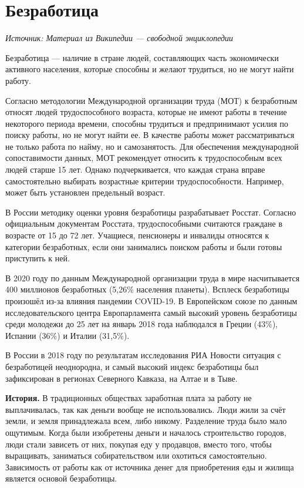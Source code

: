 
\section{Безработица}

\textit{Источник: Материал из Википедии — свободной энциклопедии}


Безработица — наличие в стране людей, составляющих часть экономически активного населения, которые способны и желают трудиться, но не могут найти работу.

Согласно методологии Международной организации труда (МОТ) к безработным относят людей трудоспособного возраста, которые не имеют работы в течение некоторого периода времени, способны трудиться и предпринимают усилия по поиску работы, но не могут найти ее. В качестве работы может рассматриваться не только работа по найму, но и самозанятость. Для обеспечения международной сопоставимости данных, МОТ рекомендует относить к трудоспособным всех людей старше 15 лет. Однако подчеркивается, что каждая страна вправе самостоятельно выбирать возрастные критерии трудоспособности. Например, может быть установлен предельный возраст.

В России методику оценки уровня безработицы разрабатывает Росстат. Согласно официальным документам Росстата, трудоспособными считаются граждане в возрасте от 15 до 72 лет. Учащиеся, пенсионеры и инвалиды относятся к категории безработных, если они занимались поиском работы и были готовы приступить к ней.

В 2020 году по данным Международной организации труда в мире насчитывается 400 миллионов безработных (5,26\% населения планеты). Всплеск безработицы произошёл из-за влияния пандемии COVID-19. В Европейском союзе по данным исследовательского центра Европарламента самый высокий уровень безработицы среди молодежи до 25 лет на январь 2018 года наблюдался в Греции (43\%), Испании (36\%) и Италии (31,5\%).

В России в 2018 году по результатам исследования РИА Новости ситуация с безработицей неоднородна, и самый высокий индекс безработицы был зафиксирован в регионах Северного Кавказа, на Алтае и в Тыве.

\textbf{История.} В традиционных обществах заработная плата за работу не выплачивалась, так как деньги вообще не использовались. Люди жили за счёт земли, и земля принадлежала всем, либо никому. Разделение труда было мало ощутимым. Когда были изобретены деньги и началось строительство городов, люди стали зависеть от них, покупая еду у продавцов, вместо того, чтобы выращивать, заниматься собирательством или охотиться самостоятельно. Зависимость от работы как от источника денег для приобретения еды и жилища является основой безработицы.

